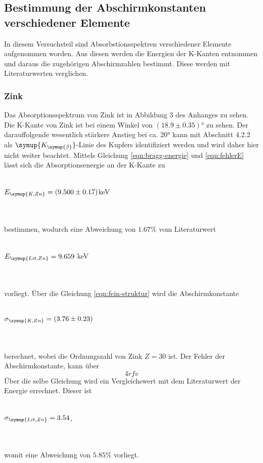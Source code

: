 \subsection{Bestimmung der Abschirmkonstanten verschiedener Elemente} 
\label{sec:bah}
    In diesem Versuchsteil sind Absorbstionsspektren verschiedener Elemente aufgenommen worden. Aus diesen werden die Energien der 
    K-Kanten entnommen und daraus die zugehörigen Abschirmzahlen bestimmt. Diese werden mit Literaturwerten verglichen.
        
        \subsubsection{Zink}
            Das Absorptionsspektrum von Zink ist in Abbildung 3 des Anhanges zu sehen.
            Die K-Kante von Zink ist bei einem Winkel von $(18.9 \pm 0.35)°$ zu sehen. Der darauffolgende
            wesentlich stärkere Anstieg bei ca. $20°$ kann mit Abschnitt 4.2.2 als 
            $\symup{K_{\symup{\beta}}}$-Linie des Kupfers identifiziert werden und wird
            daher hier nicht weiter beachtet. Mittels Gleichung \eqref{eqn:bragg-energie} und \eqref{eqn:fehlerE} lässt sich
            die Absorptionsenergie an der K-Kante zu 
            \\ \\
            \centerline{$E_{\symup{K, Zn}} = (9.500 \pm 0.17)$keV}
            \\ \\
            bestimmen, wodurch eine Abweichung von $1.67 \%$ vom Literaturwert
            \\ \\
            \centerline{$E_{\symup{Lit, Zn}} = 9.659$ keV \cite{periodic}}
            \\ \\
            vorliegt. Über die Gleichung \eqref{eqn:fein-struktur} wird die Abschirmkonstante 
            \\ \\
            \centerline{$\sigma_{\symup{K, Zn}} = (3.76 \pm 0.23)$}
            \\ \\
            berechnet, wobei die Ordnungszahl von Zink $Z = 30$ ist.
            Der Fehler der Abschirmkonstante, kann über 
            \begin{equation}
            \label{eqn:fehlerA}
                4rfv
            \end{equation}
            Über die selbe Gleichung wird ein Vergleichswert mit dem Literaturwert der Energie 
            errechnet. Dieser ist
            \\ \\
            \centerline{$\sigma_{\symup{Lit, Zn}} = 3.54$,}
            \\ \\
            womit eine Abweichung von $5.85 \%$ vorliegt.
